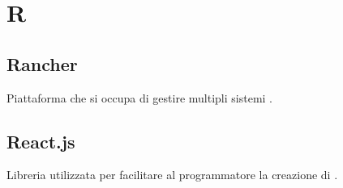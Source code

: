 \section*{R}
\markright{}

\subsection*{Rancher}
Piattaforma che si occupa di gestire multipli sistemi .

\subsection*{React.js}
Libreria  utilizzata per facilitare al programmatore la creazione di .

